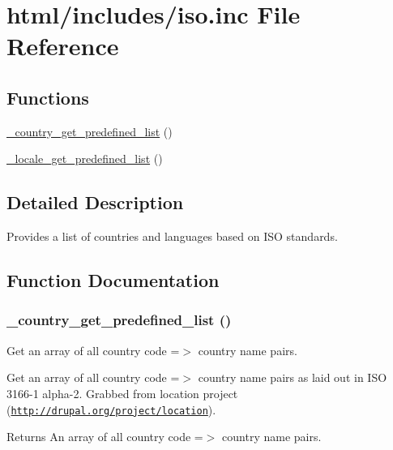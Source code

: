 \hypertarget{iso_8inc}{
\section{html/includes/iso.inc File Reference}
\label{iso_8inc}
}
\subsection*{Functions}
\begin{DoxyCompactItemize}
\item 
\hyperlink{iso_8inc_aff85d3f51026d7fd9d19b7db14d85c0d}{\_\-country\_\-get\_\-predefined\_\-list} ()
\end{DoxyCompactItemize}
\begin{Indent}{\bf }\par
{\em \label{_amgrpd41d8cd98f00b204e9800998ecf8427e}
 }\begin{DoxyCompactItemize}
\item 
\hyperlink{group__locale_gafac9d59fd436286a3f3738140ce96e82}{\_\-locale\_\-get\_\-predefined\_\-list} ()
\end{DoxyCompactItemize}
\end{Indent}


\subsection{Detailed Description}
Provides a list of countries and languages based on ISO standards. 

\subsection{Function Documentation}
\hypertarget{iso_8inc_aff85d3f51026d7fd9d19b7db14d85c0d}{
\subsubsection[{\_\-country\_\-get\_\-predefined\_\-list}]{\setlength{\rightskip}{0pt plus 5cm}\_\-country\_\-get\_\-predefined\_\-list ()}}
\label{iso_8inc_aff85d3f51026d7fd9d19b7db14d85c0d}
Get an array of all country code =$>$ country name pairs.

Get an array of all country code =$>$ country name pairs as laid out in ISO 3166-\/1 alpha-\/2. Grabbed from location project (\href{http://drupal.org/project/location}{\tt http://drupal.org/project/location}). \begin{DoxyReturn}{Returns}
An array of all country code =$>$ country name pairs. 
\end{DoxyReturn}
